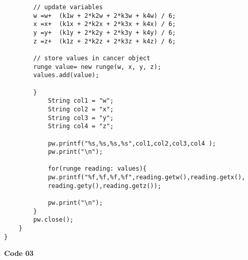\begin{framed}
\begin{verbatim}
        // update variables
        w =w+  (k1w + 2*k2w + 2*k3w + k4w) / 6;
        x =x+  (k1x + 2*k2x + 2*k3x + k4x) / 6;
        y =y+  (k1y + 2*k2y + 2*k3y + k4y) / 6;
        z =z+  (k1z + 2*k2z + 2*k3z + k4z) / 6;
    
        // store values in cancer object
        runge value= new runge(w, x, y, z);
        values.add(value);
            
        }
            String col1 = "w";
            String col2 = "x";
            String col3 = "y";
            String col4 = "z";
            
            pw.printf("%s,%s,%s,%s",col1,col2,col3,col4 ); 
            pw.print("\n");
            
            for(runge reading: values){
            pw.printf("%f,%f,%f,%f",reading.getw(),reading.getx(),
            reading.gety(),reading.getz());
  
            pw.print("\n");
        }
        pw.close();  
    }
}
\end{verbatim}
\end{framed}



\newpage

\textbf{\Large Code 03}

